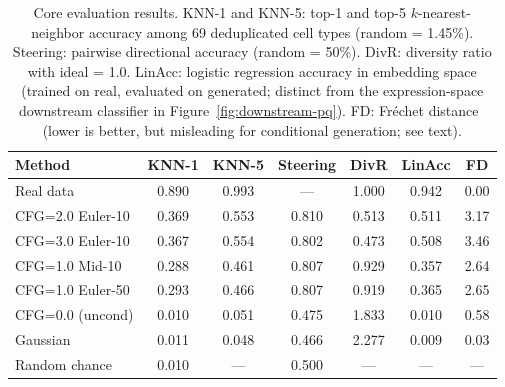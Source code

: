 \documentclass[11pt,a4paper]{article}
\begin{document}
\begin{table}[!htbp]
\caption{Core evaluation results. KNN-1 and KNN-5: top-1 and top-5 $k$-nearest-neighbor accuracy among 69 deduplicated cell types (random = 1.45\%). Steering: pairwise directional accuracy (random = 50\%). DivR: diversity ratio with ideal = 1.0. LinAcc: logistic regression accuracy in embedding space (trained on real, evaluated on generated; distinct from the expression-space downstream classifier in Figure~\ref{fig:downstream-pq}). FD: Fr\'{e}chet distance~\cite{ref-fid} (lower is better, but misleading for conditional generation; see text).\label{tab:core-results}}
\begin{tabularx}{\textwidth}{lCCCCCC}
\toprule
\textbf{Method} & \textbf{KNN-1} & \textbf{KNN-5} & \textbf{Steering} & \textbf{DivR} & \textbf{LinAcc} & \textbf{FD} \\
\midrule
Real data        & 0.890 & 0.993 & ---   & 1.000 & 0.942 & 0.00 \\
CFG=2.0 Euler-10 & 0.369 & 0.553 & 0.810 & 0.513 & 0.511 & 3.17 \\
CFG=3.0 Euler-10 & 0.367 & 0.554 & 0.802 & 0.473 & 0.508 & 3.46 \\
CFG=1.0 Mid-10   & 0.288 & 0.461 & 0.807 & 0.929 & 0.357 & 2.64 \\
CFG=1.0 Euler-50 & 0.293 & 0.466 & 0.807 & 0.919 & 0.365 & 2.65 \\
CFG=0.0 (uncond) & 0.010 & 0.051 & 0.475 & 1.833 & 0.010 & 0.58 \\
Gaussian          & 0.011 & 0.048 & 0.466 & 2.277 & 0.009 & 0.03 \\
\midrule
Random chance    & 0.010 & ---   & 0.500 & ---   & ---   & ---  \\
\bottomrule
\end{tabularx}
\end{table}
\end{document}
